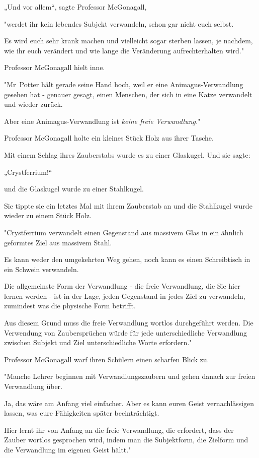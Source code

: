 {„Und vor allem“, sagte Professor McGonagall,

"werdet ihr kein lebendes Subjekt verwandeln, schon gar nicht euch selbst.

Es wird euch sehr krank machen und vielleicht sogar sterben lassen, je nachdem, wie ihr euch verändert und wie lange die Veränderung aufrechterhalten wird."

Professor McGonagall hielt inne.

"Mr~Potter hält gerade seine Hand hoch, weil er eine Animagus-Verwandlung gesehen hat - genauer gesagt, einen Menschen, der sich in eine Katze verwandelt und wieder zurück.

Aber eine Animagus-Verwandlung ist \emph{keine freie Verwandlung.}"

Professor McGonagall holte ein kleines Stück Holz aus ihrer Tasche.

Mit einem Schlag ihres Zauberstabs wurde es zu einer Glaskugel. Und sie sagte:

„Crystferrium!“

und die Glaskugel wurde zu einer Stahlkugel.

Sie tippte sie ein letztes Mal mit ihrem Zauberstab an und die Stahlkugel wurde wieder zu einem Stück Holz.

"Crystferrium verwandelt einen Gegenstand aus massivem Glas in ein ähnlich geformtes Ziel aus massivem Stahl.

Es kann weder den umgekehrten Weg gehen, noch kann es einen Schreibtisch in ein Schwein verwandeln.

Die allgemeinste Form der Verwandlung - die freie Verwandlung, die Sie hier lernen werden - ist in der Lage, jeden Gegenstand in jedes Ziel zu verwandeln, zumindest was die physische Form betrifft.

Aus diesem Grund muss die freie Verwandlung wortlos durchgeführt werden. Die Verwendung von Zaubersprüchen würde für jede unterschiedliche Verwandlung zwischen Subjekt und Ziel unterschiedliche Worte erfordern."

Professor McGonagall warf ihren Schülern einen scharfen Blick zu.

"Manche Lehrer beginnen mit Verwandlungszaubern und gehen danach zur freien Verwandlung über.

Ja, das wäre am Anfang viel einfacher. Aber es kann euren Geist vernachlässigen lassen, was eure Fähigkeiten später beeinträchtigt.

Hier lernt ihr von Anfang an die freie Verwandlung, die erfordert, dass der Zauber wortlos gesprochen wird, indem man die Subjektform, die Zielform und die Verwandlung im eigenen Geist hältt."

}
